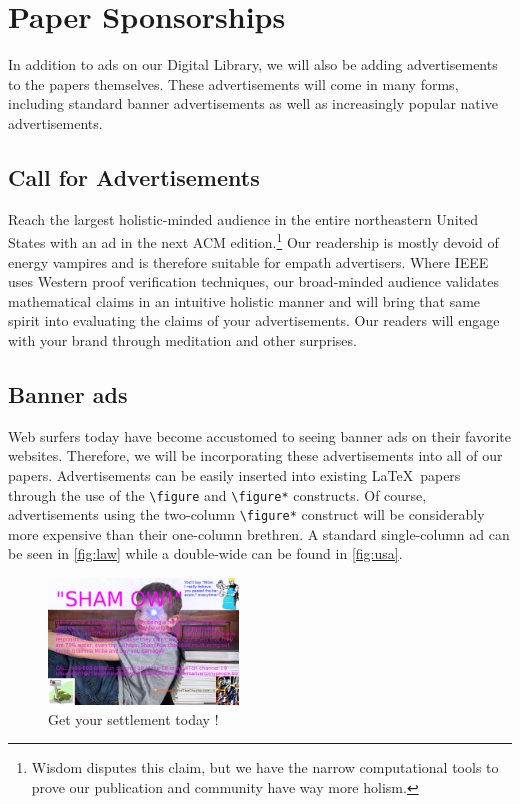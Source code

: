 \section{Paper Sponsorships}
\label{sec:sponsors}
In addition to ads on our Digital Library, we will also be adding
advertisements to the papers themselves.
These advertisements will come in many forms, including standard banner
advertisements as well as increasingly popular native advertisements.

\subsection{Call for Advertisements}
Reach the largest holistic-minded audience in the entire northeastern United
States with an ad in the next ACM edition.\footnote{Wisdom disputes this claim, but we have the narrow computational tools to prove our publication and community have way more holism.}
Our readership is mostly devoid of energy vampires and is therefore suitable
for empath advertisers.
Where IEEE uses Western proof verification techniques, our broad-minded
audience validates mathematical claims in an intuitive holistic manner and will
bring that same spirit into evaluating the claims of your advertisements.
Our readers will engage with your brand through meditation and other
surprises.

\subsection{Banner ads}
Web surfers today have become accustomed to seeing banner ads on their favorite
websites.
Therefore, we will be incorporating these advertisements into all of our
papers.
Advertisements can be easily inserted into existing \LaTeX\ papers through the
use of the \texttt{\textbackslash figure} and \texttt{\textbackslash figure*}
constructs.
Of course, advertisements using the two-column \texttt{\textbackslash figure*}
construct will be considerably more expensive than their one-column brethren.
A standard single-column ad can be seen in \autoref{fig:law} while a
double-wide can be found in \autoref{fig:usa}.

\begin{figure}
\centering
\includegraphics[width=0.45\textwidth]{figures/law-kid-ad.png}
\caption{Get your settlement today \cite{med-scale}!}
\label{fig:law}
\end{figure}

